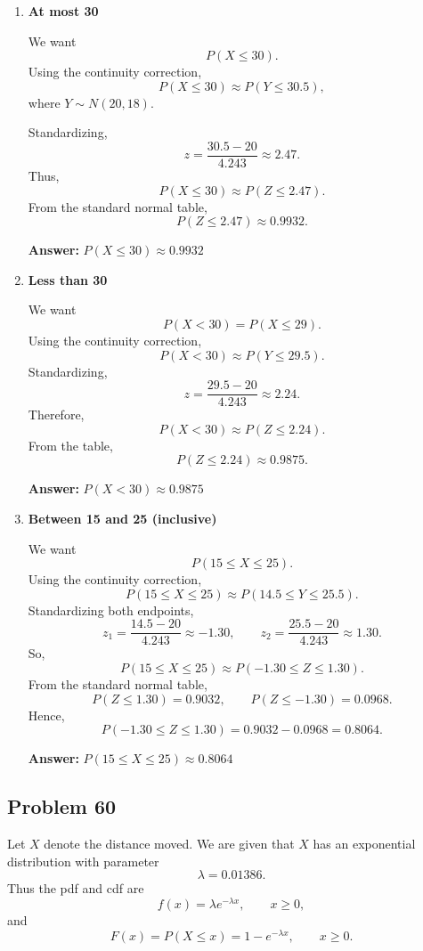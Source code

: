 \documentclass[11pt]{article}
\begin{document}
\begin{enumerate}
    \item[(a)] \textbf{At most 30}

    We want
    \[
    P(X\le 30).
    \]
    Using the continuity correction,
    \[
    P(X\le 30)\approx P(Y\le 30.5),
    \]
    where $Y\sim N(20,18)$.

    Standardizing,
    \[
    z=\frac{30.5-20}{4.243}\approx 2.47.
    \]
    Thus,
    \[
    P(X\le 30)\approx P(Z\le 2.47).
    \]
    From the standard normal table,
    \[
    P(Z\le 2.47)\approx 0.9932.
    \]

    \textbf{Answer:} $P(X\le 30)\approx 0.9932$

    \item[(b)] \textbf{Less than 30}

    We want
    \[
    P(X<30)=P(X\le 29).
    \]
    Using the continuity correction,
    \[
    P(X<30)\approx P(Y\le 29.5).
    \]
    Standardizing,
    \[
    z=\frac{29.5-20}{4.243}\approx 2.24.
    \]
    Therefore,
    \[
    P(X<30)\approx P(Z\le 2.24).
    \]
    From the table,
    \[
    P(Z\le 2.24)\approx 0.9875.
    \]

    \textbf{Answer:} $P(X<30)\approx 0.9875$

    \item[(c)] \textbf{Between 15 and 25 (inclusive)}

    We want
    \[
    P(15\le X\le 25).
    \]
    Using the continuity correction,
    \[
    P(15\le X\le 25)\approx P(14.5\le Y\le 25.5).
    \]
    Standardizing both endpoints,
    \[
    z_1=\frac{14.5-20}{4.243}\approx -1.30,
    \qquad
    z_2=\frac{25.5-20}{4.243}\approx 1.30.
    \]
    So,
    \[
    P(15\le X\le 25)\approx P(-1.30\le Z\le 1.30).
    \]
    From the standard normal table,
    \[
    P(Z\le 1.30)=0.9032,
    \qquad
    P(Z\le -1.30)=0.0968.
    \]
    Hence,
    \[
    P(-1.30\le Z\le 1.30)=0.9032-0.0968=0.8064.
    \]

    \textbf{Answer:} $P(15\le X\le 25)\approx 0.8064$
\end{enumerate}

\subsection*{Problem 60}

Let $X$ denote the distance moved. We are given that $X$ has an exponential distribution with parameter
\[
\lambda=0.01386.
\]
Thus the pdf and cdf are
\[
f(x)=\lambda e^{-\lambda x}, \qquad x\ge 0,
\]
and
\[
F(x)=P(X\le x)=1-e^{-\lambda x}, \qquad x\ge 0.
\]
\end{document}
